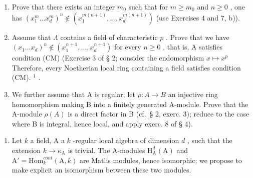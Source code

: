 \begin{enumerate}
\def\labelenumi{\alph{enumi})}
\item
  Prove that there exists an integer \(m_0\) such that for \(m \geqslant m_0\) and \(n \geqslant 0\) , one has \((x_1^m \ldots x_d^m)^n \not\in (x_1^{m(n+1)}, \ldots, x_d^{m(n+1)})\) (use Exercises 4 and 7, b)).
\item
  Assume that \(\Lambda\) contains a field of characteristic \(p\) . Prove that we have \((x_{1} \ldots x_{d})^{n} \notin (x_{1}^{n+1}, \ldots, x_{d}^{n+1})\) for every \(n \geqslant 0\) , that is, A satisfies condition (CM) (Exercise 3 of § 2; consider the endomorphism \(x \mapsto x^p\) Therefore, every Noetherian local ring containing a field satisfies condition (CM). \(^{1}\) .
\item
  We further assume that A is regular; let \(\rho: A \to B\) an injective ring homomorphism making B into a finitely generated A-module. Prove that the A-module \(\rho(A)\) is a direct factor in B (cf.~§ 2, exerc. 3); reduce to the case where B is integral, hence local, and apply exerc. 8 of § 4).
\end{enumerate}

\begin{enumerate}
\def\labelenumi{\arabic{enumi})}
\setcounter{enumi}{9}
\tightlist
\item
  Let \(k\) a field, A a \(k\) -regular local algebra of dimension \(d\) , such that the extension \(k \to \kappa_{\mathrm{A}}\) is trivial. The A-modules \(\mathrm{H}_{\mathrm{A}}^{d}(\mathrm{A})\) and \(\mathrm{A}' = \mathrm{Hom}_k^{cont}(\mathrm{A}, k)\) are Matlis modules, hence isomorphic; we propose to make explicit an isomorphism between these two modules.
\end{enumerate}

